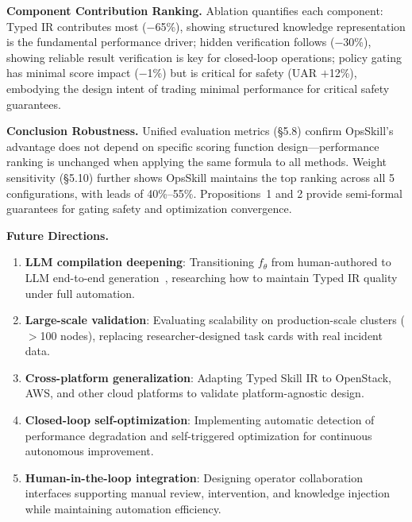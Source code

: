 \documentclass[conference,10pt]{IEEEtran}
\begin{document}
\textbf{Component Contribution Ranking.}
Ablation quantifies each component: Typed IR contributes most ($-$65\%), showing structured knowledge representation is the fundamental performance driver; hidden verification follows ($-$30\%), showing reliable result verification is key for closed-loop operations; policy gating has minimal score impact ($-$1\%) but is critical for safety (UAR $+$12\%), embodying the design intent of trading minimal performance for critical safety guarantees.

\textbf{Conclusion Robustness.}
Unified evaluation metrics (\S5.8) confirm OpsSkill's advantage does not depend on specific scoring function design---performance ranking is unchanged when applying the same formula to all methods.
Weight sensitivity (\S5.10) further shows OpsSkill maintains the top ranking across all 5 configurations, with leads of 40\%--55\%.
Propositions~1 and 2 provide semi-formal guarantees for gating safety and optimization convergence.

\textbf{Future Directions.}
\begin{enumerate}
  \item \textbf{LLM compilation deepening}: Transitioning $f_\theta$ from human-authored to LLM end-to-end generation~\cite{openai2023gpt4}, researching how to maintain Typed IR quality under full automation.
  \item \textbf{Large-scale validation}: Evaluating scalability on production-scale clusters ($>$100 nodes), replacing researcher-designed task cards with real incident data.
  \item \textbf{Cross-platform generalization}: Adapting Typed Skill IR to OpenStack, AWS, and other cloud platforms to validate platform-agnostic design.
  \item \textbf{Closed-loop self-optimization}: Implementing automatic detection of performance degradation and self-triggered optimization for continuous autonomous improvement.
  \item \textbf{Human-in-the-loop integration}: Designing operator collaboration interfaces supporting manual review, intervention, and knowledge injection while maintaining automation efficiency.
\end{enumerate}



\end{document}
